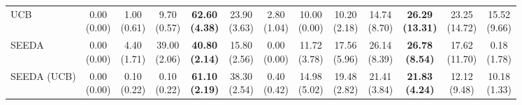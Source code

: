 \begin{table}[H]
{\begin{tabular}{l|cccccc|cccccc}
UCB & \makecell{0.00 \\ (0.00)} & \makecell{1.00 \\ (0.61)} & {\cellcolor[HTML]{C8E6C9}} \makecell{9.70 \\ (0.57)} & \bfseries \makecell{62.60 \\ (4.38)} & \makecell{23.90 \\ (3.63)} & \makecell{2.80 \\ (1.04)} & \makecell{10.00 \\ (0.00)} & \makecell{10.20 \\ (2.18)} & {\cellcolor[HTML]{C8E6C9}} \makecell{14.74 \\ (8.70)} & \bfseries \makecell{26.29 \\ (13.31)} & \makecell{23.25 \\ (14.72)} & \makecell{15.52 \\ (9.66)} \\
SEEDA & \makecell{0.00 \\ (0.00)} & \makecell{4.40 \\ (1.71)} & {\cellcolor[HTML]{C8E6C9}} \makecell{39.00 \\ (2.06)} & \bfseries \makecell{40.80 \\ (2.14)} & \makecell{15.80 \\ (2.56)} & \makecell{0.00 \\ (0.00)} & \makecell{11.72 \\ (3.78)} & \makecell{17.56 \\ (5.96)} & {\cellcolor[HTML]{C8E6C9}} \makecell{26.14 \\ (8.39)} & \bfseries \makecell{26.78 \\ (8.54)} & \makecell{17.62 \\ (11.70)} & \makecell{0.18 \\ (1.78)} \\
SEEDA (UCB) & \makecell{0.00 \\ (0.00)} & \makecell{0.10 \\ (0.22)} & {\cellcolor[HTML]{C8E6C9}} \makecell{0.10 \\ (0.22)} & \bfseries \makecell{61.10 \\ (2.19)} & \makecell{38.30 \\ (2.54)} & \makecell{0.40 \\ (0.42)} & \makecell{14.98 \\ (5.02)} & \makecell{19.48 \\ (2.82)} & {\cellcolor[HTML]{C8E6C9}} \makecell{21.41 \\ (3.84)} & \bfseries \makecell{21.83 \\ (4.24)} & \makecell{12.12 \\ (9.48)} & \makecell{10.18 \\ (1.33)} \\

\end{tabular}}
\end{table}
